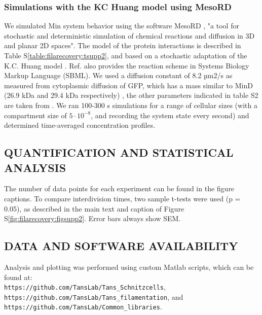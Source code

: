 \subsubsection{Simulations with the KC Huang model using MesoRD}
We simulated Min system behavior using the software MesoRD \cite{Hattne2005}, "a tool for stochastic and deterministic simulation of chemical reactions and diffusion in 3D and planar 2D spaces". 
The model of the protein interactions is described in Table S\ref{table:filarecovery:tsupp2}, and based on a stochastic adaptation \cite{Fange2006} of the K.C. Huang model \cite{Huang2003}. Ref.  \cite{Fange2006} also provides the reaction scheme in Systems Biology Markup Language (SBML). 
We used a diffusion constant of 8.2 µm2/s as measured from cytoplasmic diffusion of GFP, which has a mass similar to MinD (26.9 kDa and 29.4 kDa respectively) \cite{Elowitz1999}, the other parameters indicated in table S2 are taken from \cite{Fange2006}. 
We ran 100-300 s simulations for a range of cellular sizes (with a compartment size of $5\cdot10^{-8}$, and recording the system state every second) and determined time-averaged concentration profiles.

\subsection{QUANTIFICATION AND STATISTICAL ANALYSIS}
The number of data points for each experiment can be found in the figure captions. To compare interdivision times, two sample t-tests were used (p = 0.05), as described in the main text and caption of Figure S\ref{fig:filarecovery:figsupp2}. Error bars always show SEM.

\subsection{DATA AND SOFTWARE AVAILABILITY}
Analysis and plotting was performed using custom Matlab scripts, which can be found at: \\
\texttt{https://github.com/TansLab/Tans\_Schnitzcells}, \\ 
\texttt{https://github.com/TansLab/Tans\_filamentation}, and \\
\texttt{https://github.com/TansLab/Common\_libraries}.
